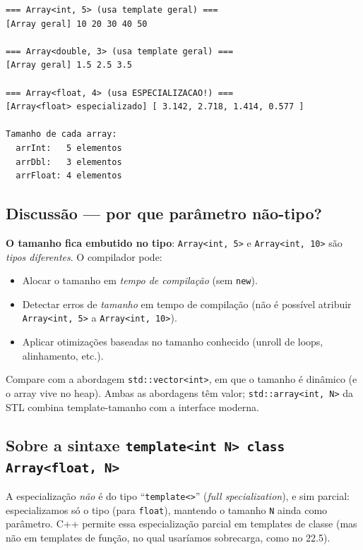 \documentclass[11pt,a4paper]{article}
\begin{document}
\begin{saidabox}
\begin{lstlisting}[style=terminal]
=== Array<int, 5> (usa template geral) ===
[Array geral] 10 20 30 40 50

=== Array<double, 3> (usa template geral) ===
[Array geral] 1.5 2.5 3.5

=== Array<float, 4> (usa ESPECIALIZACAO!) ===
[Array<float> especializado] [ 3.142, 2.718, 1.414, 0.577 ]

Tamanho de cada array:
  arrInt:   5 elementos
  arrDbl:   3 elementos
  arrFloat: 4 elementos
\end{lstlisting}
\end{saidabox}\normalcolor

\subsection*{Discuss\~ao --- por que par\^ametro n\~ao-tipo?}

\textbf{O tamanho fica embutido no tipo}: \texttt{Array<int, 5>} e \texttt{Array<int, 10>} s\~ao \emph{tipos diferentes}. O compilador pode:

\begin{itemize}[leftmargin=*,itemsep=0pt]
  \item Alocar o tamanho em \emph{tempo de compila\c{c}\~ao} (sem \texttt{new}).
  \item Detectar erros de \emph{tamanho} em tempo de compila\c{c}\~ao (n\~ao \'e poss\'ivel atribuir \texttt{Array<int, 5>} a \texttt{Array<int, 10>}).
  \item Aplicar otimiza\c{c}\~oes baseadas no tamanho conhecido (unroll de loops, alinhamento, etc.).
\end{itemize}

Compare com a abordagem \texttt{std::vector<int>}, em que o tamanho \'e din\^amico (e o array vive no heap). Ambas as abordagens t\^em valor; \texttt{std::array<int, N>} da STL combina template-tamanho com a interface moderna.

\subsection*{Sobre a sintaxe \texttt{template<int N> class Array<float, N>}}

A especializa\c{c}\~ao \emph{n\~ao} \'e do tipo ``\texttt{template<>}'' (\emph{full specialization}), e sim parcial: especializamos s\'o o tipo (para \texttt{float}), mantendo o tamanho \texttt{N} ainda como par\^ametro. C++ permite essa especializa\c{c}\~ao parcial em templates de classe (mas n\~ao em templates de fun\c{c}\~ao, no qual usar\'iamos sobrecarga, como no 22.5).
\end{document}
